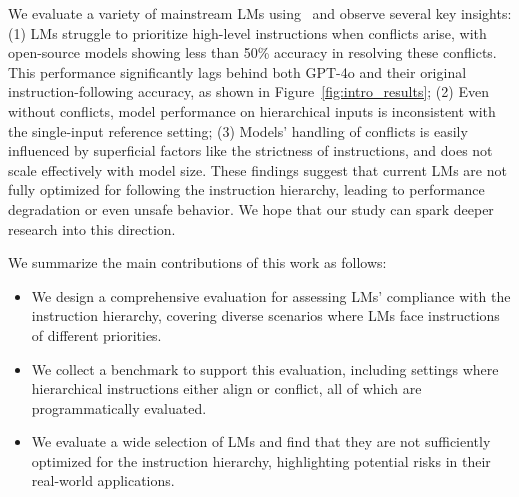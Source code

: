 We evaluate a variety of mainstream LMs using \benchmark\ and observe several key insights: (1) LMs struggle to prioritize high-level instructions when conflicts arise, with open-source models showing less than 50\% accuracy in resolving these conflicts. This performance significantly lags behind both GPT-4o and their original instruction-following accuracy, as shown in Figure~\ref{fig:intro_results}; (2) Even without conflicts, model performance on hierarchical inputs is inconsistent with the single-input reference setting; (3) Models' handling of conflicts is easily influenced by superficial factors like the strictness of instructions, and does not scale effectively with model size. These findings suggest that current LMs are not fully optimized for following the instruction hierarchy, leading to performance degradation or even unsafe behavior. We hope that our study can spark deeper research into this direction.

We summarize the main contributions of this work as follows:

\begin{itemize}
      [noitemsep,topsep=3pt,parsep=1pt,partopsep=0pt,leftmargin=0.4cm]
      \item We design a comprehensive evaluation for assessing LMs' compliance with the instruction hierarchy, covering diverse scenarios where LMs face instructions of different priorities.
      \item We collect a benchmark to support this evaluation, including settings where hierarchical instructions either align or conflict, all of which are programmatically evaluated.
      \item We evaluate a wide selection of LMs and find that they are not sufficiently optimized for the instruction hierarchy, highlighting potential risks in their real-world applications.
\end{itemize}
